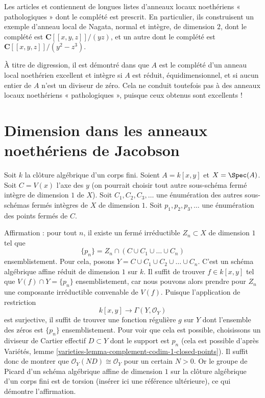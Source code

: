 \medskip\noindent
Les articles \cite{Nishimura-few} et \cite{Nishimura-few-II}
contiennent de longues listes d'anneaux locaux
noethériens « pathologiques » dont le complété est prescrit. En particulier, ils construisent
un exemple d'anneau local de Nagata, normal et intègre, de dimension $2$, dont le
complété est $\mathbf{C}[[x, y, z]]/(yz)$, et un autre dont le complété
est $\mathbf{C}[[x, y, z]]/(y^2 - z^3)$.

\medskip\noindent
À titre de digression, il est démontré dans \cite{Loepp} que $A$ est le complété d'un
anneau local noethérien excellent et intègre si $A$ est réduit, équidimensionnel,
et si aucun entier de $A$ n'est un diviseur de zéro. Cela ne conduit toutefois pas
à des anneaux locaux noethériens « pathologiques », puisque ceux obtenus sont excellents !




\section{Dimension dans les anneaux noethériens de Jacobson}
\label{section-noetherian-jacobson}

\noindent
Soit $k$ la clôture algébrique d'un corps fini.
Soient $A = k[x, y]$ et $X = \Spec(A)$.
Soit $C = V(x)$ l'axe des $y$ (on pourrait choisir tout autre
sous-schéma fermé intègre de dimension $1$ de $X$).
Soit $C_1, C_2, C_3, \ldots$ une énumération
des autres sous-schémas fermés intègres de $X$ de dimension $1$.
Soit $p_1, p_2, p_3, \ldots$ une
énumération des points fermés de $C$.

\medskip\noindent
Affirmation : pour tout $n$, il existe un fermé irréductible
$Z_n \subset X$ de dimension $1$ tel que
$$
\{p_n\} = Z_n \cap (C \cup C_1 \cup \ldots \cup C_n)
$$
ensemblistement. Pour cela, posons
$Y = C \cup C_1 \cup C_2 \cup \ldots \cup C_n$.
C'est un schéma algébrique affine réduit de dimension $1$ sur $k$.
Il suffit de trouver $f \in k[x, y]$ tel que $V(f) \cap  Y = \{p_n\}$
ensemblistement, car nous pouvons alors prendre pour $Z_n$ une composante
irréductible convenable de $V(f)$. Puisque l'application de restriction
$$
k[x, y] \longrightarrow \Gamma(Y, \mathcal{O}_Y)
$$
est surjective, il suffit de trouver une fonction régulière $g$ sur $Y$
dont l'ensemble des zéros est $\{p_n\}$ ensemblistement.
Pour voir que cela est possible, choisissons un diviseur de Cartier effectif
$D \subset Y$ dont le support est $p_n$ (cela est possible d'après
Variétés, lemme \ref{varieties-lemma-complement-codim-1-closed-points}).
Il suffit donc de montrer que $\mathcal{O}_Y(ND) \cong \mathcal{O}_Y$
pour un certain $N > 0$. Or le groupe de Picard d'un schéma algébrique
affine de dimension $1$ sur la clôture algébrique d'un corps fini est de torsion
(insérer ici une référence ultérieure), ce qui démontre l'affirmation.

